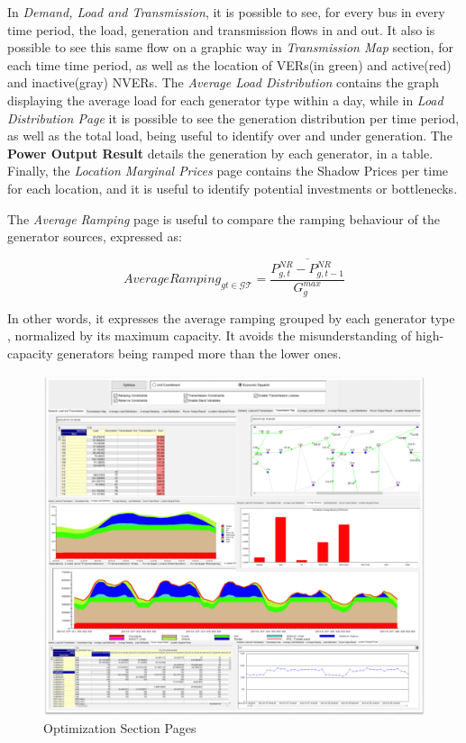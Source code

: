 \documentclass[12pt,LUDisStyle,twosided]{book}
\newcommand{\mc}{\mathcal}
\begin{document}
In \textit{Demand, Load and Transmission}, it is possible to see, for every bus in every time period, the load, generation and transmission flows in and out. It also is possible to see this same flow on a graphic way in \textit{Transmission Map} section, for each time time period, as well as the location of VERs(in green) and active(red) and inactive(gray) NVERs. The \textit{Average Load Distribution} contains the graph displaying the average load for each generator type within a day, while in \textit{Load Distribution Page} it is possible to see the generation distribution per time period, as well as the total load, being useful to identify over and under generation. The \textbf{Power Output Result} details the generation by each generator, in a table. Finally, the \textit{Location Marginal Prices} page contains the Shadow Prices per time for each location, and it is useful to identify potential investments or bottlenecks.

The \textit{Average Ramping} page is useful to compare the ramping behaviour of the generator sources, expressed as:

\begin{equation}
    AverageRamping_{gt \in \mc{GT}} = \overline{\dfrac{P^{NR}_{g,t} - P^{NR}_{g,t-1}}{G^{max}_{g}}}
\end{equation}

In other words, it expresses the average ramping grouped by each generator type , normalized by its maximum capacity. It avoids the misunderstanding of high-capacity generators being ramped more than the lower ones.

\begin{figure}[h] 
	\begin{center}
		\includegraphics[width=\textwidth,height=\textheight,keepaspectratio]{aimmsOptimizationSectionPages.png}
	  	\caption{Optimization Section Pages}
     	\label{fig:optimizationSectionPages}
	\end{center}
\end{figure}
\end{document}
